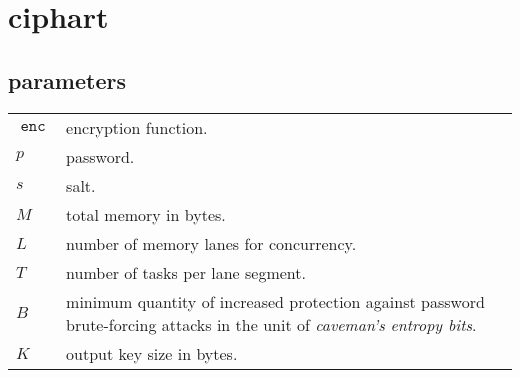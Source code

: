\documentclass[twocolumn]{article}
\DeclareMathOperator{\enc}{\mathtt{enc}}
\begin{document}
\section{ciphart}
\subsection{parameters}
\begin{tabularx}{\columnwidth}{lX}
    $\enc$ & encryption function.\\
    $p$ & password.\\
    $s$ & salt.\\
    $M$ & total memory in bytes.\\
    $L$ & number of memory lanes for concurrency.\\
    $T$ & number of tasks per lane segment.\\
    $B$ & minimum quantity of increased protection against password
            brute-forcing attacks in the unit of \emph{caveman's entropy
            bits}.\\
    $K$ & output key size in bytes.\\
\end{tabularx}
\end{document}
